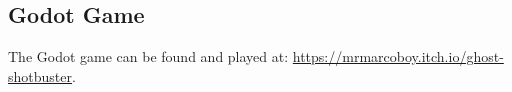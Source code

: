 ﻿\subsection{Godot Game}
The Godot game can be found and played at: \url{https://mrmarcoboy.itch.io/ghost-shotbuster}.